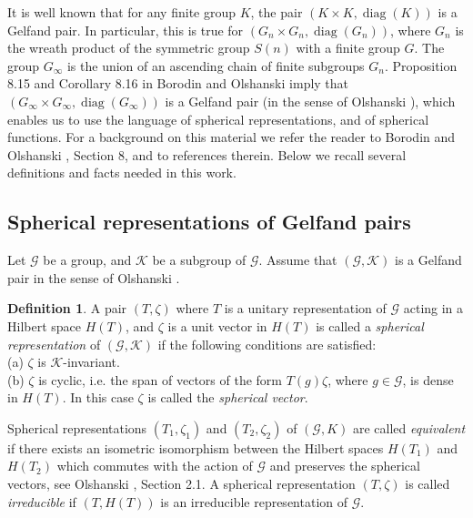 \documentclass[12pt]{amsart}
\theoremstyle{definition}
\newtheorem{defn}[thm]{Definition}
\numberwithin{equation}{section}
\DeclareMathOperator{\diag}{diag}
\begin{document}
 It is well known that for any finite group $K$, the pair
 $\left(K\times K,\diag (K)\right)$ is a Gelfand pair. In particular,
 this is true for
 $\left(G_n\times G_n,\diag\left(G_n\right)\right)$, where $G_n$ is the wreath product of the symmetric group $S(n)$ with a finite group $G$. The group $G_{\infty}$ is the union of an ascending chain of finite subgroups $G_n$. Proposition
8.15 and Corollary 8.16 in Borodin and Olshanski \cite{BorodinOlshanskiBook}
imply that $\left(G_{\infty}\times G_{\infty},\diag\left(G_{\infty}\right)\right)$
is a Gelfand pair (in the sense of Olshanski \cite{Olshanski}), which enables us
to use the language of spherical representations, and of spherical functions.
For a background on this material we refer the reader to Borodin and Olshanski
\cite{BorodinOlshanskiBook}, Section 8, and to references therein.  Below
we recall several definitions and facts needed in this work.

\subsection{Spherical representations of Gelfand pairs}
 Let $\mathcal{G}$ be a group, and $\mathcal{K}$ be a subgroup of $\mathcal{G}$.
Assume that $\left(\mathcal{G},\mathcal{K}\right)$ is a Gelfand pair in the sense of Olshanski \cite{Olshanski}.
\begin{defn}
A pair $\left(T,\zeta\right)$  where $T$ is a unitary representation of $\mathcal{G}$ acting in a Hilbert space $H(T)$, and $\zeta$ is a unit vector in $H(T)$ is called a \textit{spherical representation} of  $\left(\mathcal{G},\mathcal{K}\right)$
if the following conditions are satisfied:\\
(a) $\zeta$ is $\mathcal{K}$-invariant.\\
(b) $\zeta$ is cyclic, i.e. the span of vectors of the form $T(g)\zeta$, where $g\in \mathcal{G}$, is dense in $H(T)$.
In this case $\zeta$ is called the \textit{spherical vector}.
\end{defn}
Spherical representations $\left(T_1,\zeta_1\right)$ and $\left(T_2,\zeta_2\right)$
of $\left(\mathcal{G},K\right)$ are called \textit{equivalent} if
there exists an  isometric isomorphism between the  Hilbert spaces
$H\left(T_1\right)$ and $H\left(T_2\right)$ which commutes with the action of
$\mathcal{G}$  and preserves the spherical vectors, see Olshanski \cite{OlshanskiNato}, Section 2.1.
 A spherical representation $\left(T,\zeta\right)$ is called \textit{irreducible} if $(T, H(T))$ is an irreducible representation of $\mathcal{G}$.
\end{document}
